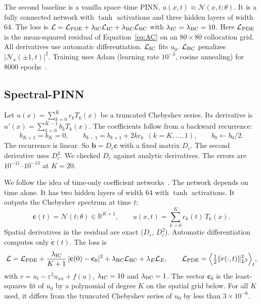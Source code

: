 The second baseline is a vanilla space--time PINN, $u(x,t)\approx\mathcal N(x,t;\theta)$. It is a fully connected network with $\tanh$ activations and three hidden layers of width 64. The loss is $\mathcal L=\mathcal L_{\rm PDE}+\lambda_{\rm IC}\mathcal L_{\rm IC}+\lambda_{\rm BC}\mathcal L_{\rm BC}$ with $\lambda_{\rm IC}=\lambda_{\rm BC}=10$. Here $\mathcal L_{\rm PDE}$ is the mean-squared residual of Equation~\eqref{eq:AC} on an $80\times80$ collocation grid. All derivatives use automatic differentiation. $\mathcal L_{\rm IC}$ fits $u_0$. $\mathcal L_{\rm BC}$ penalizes $|\mathcal N_x(\pm1,t)|^2$. Training uses Adam (learning rate $10^{-3}$, cosine annealing) for 8000 epochs~\cite{Raissi,Wight,Mattey}. 

\subsection{Spectral-PINN}\label{sec:spectral}

Let $u(x)=\sum_{k=0}^{K}c_kT_k(x)$ be a truncated Chebyshev series. Its derivative is $u'(x)=\sum_{k=0}^{K-1}b_kT_k(x)$. The coefficients follow from a backward recurrence:
\begin{equation}\label{eq:cheb-recurrence}
b_{K+1}=b_K=0,\qquad b_{k-1}=b_{k+1}+2kc_k\ \ (k=K,\dots,1),\qquad b_0\leftarrow b_0/2.
\end{equation}
The recurrence is linear. So $\mathbf{b}=D_c\mathbf{c}$ with a fixed matrix $D_c$. The second derivative uses $D_c^2$. We checked $D_c$ against analytic derivatives. The errors are $10^{-11}$--$10^{-13}$ at $K=20$.\label{sec:cheb-coeff}

We follow the idea of time-only coefficient networks~\cite{ref_Xia2023}. The network depends on time alone. It has two hidden layers of width 64 with $\tanh$ activations. It outputs the Chebyshev spectrum at time $t$:
\begin{equation}\label{eq:spectral-pinn}
\mathbf c(t)=\mathcal N(t;\theta)\in\mathbb R^{K+1}, \qquad u(x,t)=\sum_{k=0}^{K}c_k(t)\,T_k(x).
\end{equation}
Spatial derivatives in the residual are exact ($D_c$, $D_c^2$). Automatic differentiation computes only $\dot{\mathbf c}(t)$. The loss is
\begin{equation}\label{eq:loss}
\mathcal L=\mathcal L_{\rm PDE}+\frac{\lambda_{\rm IC}}{K+1}\,|\mathbf c(0)-\mathbf c_0|^2+\lambda_{\rm BC}\mathcal L_{\rm BC}+\lambda_E\mathcal L_E,\qquad
\mathcal L_{\rm PDE}=\Big\langle\tfrac12\|r(\cdot,t)\|_{L^2}^2\Big\rangle_t,
\end{equation}
with $r=u_t-\varepsilon^2u_{xx}+f(u)$, $\lambda_{\rm IC}=10$ and $\lambda_{\rm BC}=1$. The vector $\mathbf c_0$ is the least-squares fit of $u_0$ by a polynomial of degree $K$ on the spatial grid below. For all $K$ used, it differs from the truncated Chebyshev series of $u_0$ by less than $3\times10^{-6}$.

